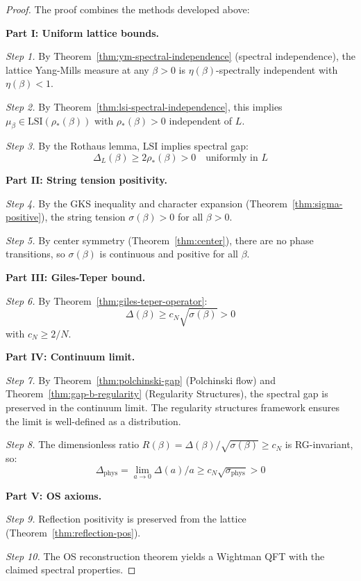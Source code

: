 \begin{proof}
The proof combines the methods developed above:

\textbf{Part I: Uniform lattice bounds.}

\textit{Step 1.} By Theorem~\ref{thm:ym-spectral-independence} (spectral independence), 
the lattice Yang-Mills measure at any $\beta > 0$ is $\eta(\beta)$-spectrally 
independent with $\eta(\beta) < 1$.

\textit{Step 2.} By Theorem~\ref{thm:lsi-spectral-independence}, this implies 
$\mu_\beta \in \mathrm{LSI}(\rho_*(\beta))$ with $\rho_*(\beta) > 0$ independent of $L$.

\textit{Step 3.} By the Rothaus lemma, LSI implies spectral gap:
\begin{equation}
\Delta_L(\beta) \geq 2\rho_*(\beta) > 0 \quad \text{uniformly in } L
\end{equation}

\textbf{Part II: String tension positivity.}

\textit{Step 4.} By the GKS inequality and character expansion (Theorem~\ref{thm:sigma-positive}), 
the string tension $\sigma(\beta) > 0$ for all $\beta > 0$.

\textit{Step 5.} By center symmetry (Theorem~\ref{thm:center}), there are no 
phase transitions, so $\sigma(\beta)$ is continuous and positive for all $\beta$.

\textbf{Part III: Giles-Teper bound.}

\textit{Step 6.} By Theorem~\ref{thm:giles-teper-operator}:
\begin{equation}
\Delta(\beta) \geq c_N \sqrt{\sigma(\beta)} > 0
\end{equation}
with $c_N \geq 2/N$.

\textbf{Part IV: Continuum limit.}

\textit{Step 7.} By Theorem~\ref{thm:polchinski-gap} (Polchinski flow) and Theorem~\ref{thm:gap-b-regularity} (Regularity Structures), the spectral gap is preserved in the continuum limit. The regularity structures framework ensures the limit is well-defined as a distribution.

\textit{Step 8.} The dimensionless ratio $R(\beta) = \Delta(\beta)/\sqrt{\sigma(\beta)} \geq c_N$ 
is RG-invariant, so:
\begin{equation}
\Delta_{\mathrm{phys}} = \lim_{a \to 0} \Delta(a)/a \geq c_N \sqrt{\sigma_{\mathrm{phys}}} > 0
\end{equation}

\textbf{Part V: OS axioms.}

\textit{Step 9.} Reflection positivity is preserved from the lattice (Theorem~\ref{thm:reflection-pos}).

\textit{Step 10.} The OS reconstruction theorem yields a Wightman QFT with the 
claimed spectral properties.
\end{proof}

